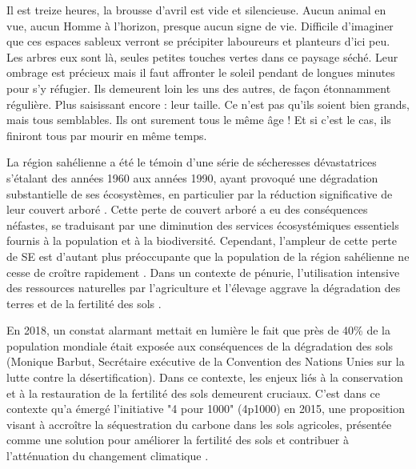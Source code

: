 \documentclass{article}
\begin{document}
Il est treize heures, la brousse d’avril est vide et silencieuse. Aucun animal en vue, aucun Homme à l’horizon, presque aucun signe de vie. Difficile d’imaginer que ces espaces sableux verront se précipiter laboureurs et planteurs d’ici peu. Les arbres eux sont là, seules petites touches vertes dans ce paysage séché. Leur ombrage est précieux mais il faut affronter le soleil pendant de longues minutes pour s’y réfugier. Ils demeurent loin les uns des autres, de façon étonnamment régulière. Plus saisissant encore : leur taille. Ce n’est pas qu’ils soient bien grands, mais tous semblables. Ils ont surement tous le même âge ! Et si c’est le cas, ils finiront tous par mourir en même temps.

La région sahélienne a été le témoin d'une série de sécheresses dévastatrices s'étalant des années 1960 aux années 1990, ayant provoqué une dégradation substantielle de ses écosystèmes, en particulier par la réduction significative de leur couvert arboré \cite{mbow_what_2015}. Cette perte de couvert arboré a eu des conséquences néfastes, se traduisant par une diminution des services écosystémiques essentiels fournis à la population et à la biodiversité. Cependant, l'ampleur de cette perte de SE est d'autant plus préoccupante que la population de la région sahélienne ne cesse de croître rapidement \cite{cesaro_reforestation_2023}. Dans un contexte de pénurie, l'utilisation intensive des ressources naturelles par l'agriculture et l'élevage aggrave la dégradation des terres et de la fertilité des sols \cite{tappan_landscapes_2016}.

En 2018, un constat alarmant mettait en lumière le fait que près de 40\% de la population mondiale était exposée aux conséquences de la dégradation des sols (Monique Barbut, Secrétaire exécutive de la Convention des Nations Unies sur la lutte contre la désertification). Dans ce contexte, les enjeux liés à la conservation et à la restauration de la fertilité des sols demeurent cruciaux. 
C'est dans ce contexte qu'a émergé l'initiative "4 pour 1000" (4p1000) en 2015, une proposition visant à accroître la séquestration du carbone dans les sols agricoles, présentée comme une solution pour améliorer la fertilité des sols et contribuer à l'atténuation du changement climatique \cite{kon_kam_king_soil_2018}.
\end{document}
